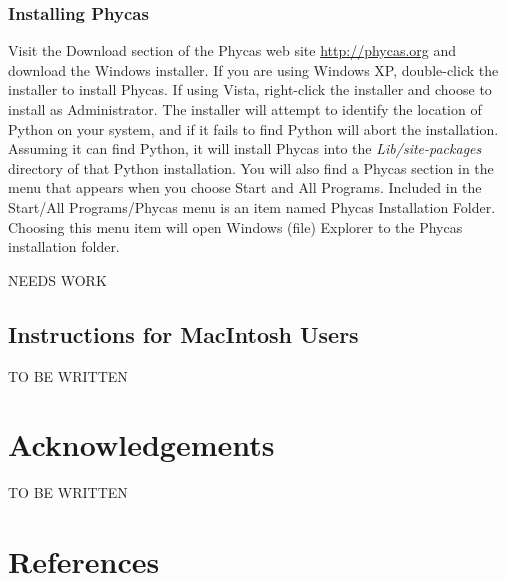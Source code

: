 \documentclass[10pt]{article}
\newcommand{\pathname}[1]{{\em #1}}			%
\newcommand{\menu}[1]{{\sf #1}}				%
\begin{document}
\subsubsection{Installing Phycas}

Visit the Download section of the Phycas web site \url{http://phycas.org} and download the Windows installer. If you are using Windows XP, double-click the installer to install Phycas. If using Vista, right-click the installer and choose to install as Administrator. The installer will attempt to identify the location of Python on your system, and if it fails to find Python will abort the installation. Assuming it can find Python, it will install Phycas into the \pathname{Lib/site-packages} directory of that Python installation. You will also find a Phycas section in the menu that appears when you choose \menu{Start} and \menu{All Programs}. Included in the \menu{Start/All Programs/Phycas} menu is an item named \menu{Phycas Installation Folder}. Choosing this menu item will open Windows (file) Explorer to the Phycas installation folder.

NEEDS WORK

\subsection{Instructions for MacIntosh Users}

TO BE WRITTEN

%
%

\section*{Acknowledgements}

TO BE WRITTEN

\section*{References}
\renewcommand{\bibsection}{}


\printindex
\end{document}
